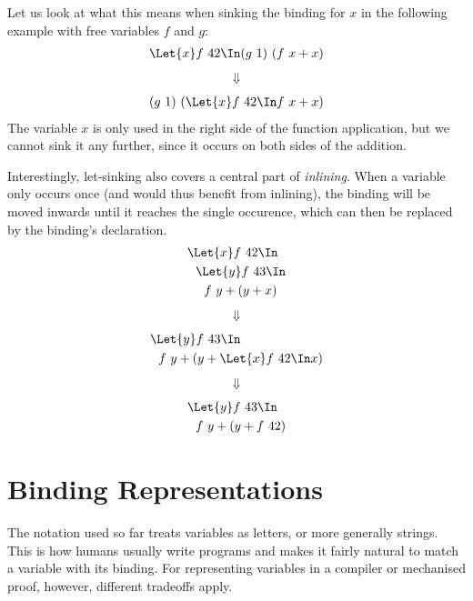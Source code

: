     Let us look at what this means when sinking the binding for $x$
    in the following example with free variables $f$ and $g$:
    \begin{align*}
      \Let{x} f\ 42 \In (g\ 1)\ (f\ x + x)
    \end{align*}
    \begin{align*}
      \Downarrow
    \end{align*}
    \begin{align*}
      (g\ 1)\ (\Let{x} f\ 42 \In f\ x + x)
    \end{align*}
    The variable $x$ is only used in the right side of the function application,
    but we cannot sink it any further,
    since it occurs on both sides of the addition.

    Interestingly, let-sinking also covers a central part of \emph{inlining}.
    When a variable only occurs once (and would thus benefit from inlining),
    the binding will be moved inwards until it reaches the single occurence,
    which can then be replaced by the binding's declaration.
    \begin{align*}
      &\Let{x} f\ 42 \In          \\
      &\ \ \Let{y} f\ 43 \In      \\
      &\ \ \ \ f\ y + (y + x)
    \end{align*}
    \begin{align*}
      \Downarrow
    \end{align*}
    \begin{align*}
      &\Let{y} f\ 43 \In      \\
      &\ \ f\ y + (y + \Let{x} f\ 42 \In x)
    \end{align*}
    \begin{align*}
      \Downarrow
    \end{align*}
    \begin{align*}
      &\Let{y} f\ 43 \In      \\
      &\ \ f\ y + (y + f\ 42)
    \end{align*}

\section{Binding Representations}
\label{sec:binding-representations}
    The notation used so far treats variables as letters, or more generally strings.
    This is how humans usually write programs
    and makes it fairly natural to match a variable with its binding.
    For representing variables in a compiler or mechanised proof, however,
    different tradeoffs apply.

